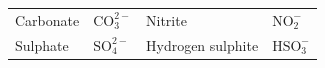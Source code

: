 {{\begin{center}
\begin{tabular}[t]{|l|l|l|l|}
        Carbonate &
    
    
        \begin{math}\mathrm{CO}_{3}^{2-}\end{math} &
    
    
        Nitrite &
    
    
        \begin{math}\mathrm{NO}_{2}^{-}\end{math}%
     \tabularnewline\cline{1-1}\cline{2-2}\cline{3-3}\cline{4-4}
    
    
        Sulphate &
    
    
        \begin{math}\mathrm{SO}_{4}^{2-}\end{math} &
    
    
        Hydrogen sulphite &
    
    
        \begin{math}\mathrm{HSO}_{3}^{-}\end{math}%
     \tabularnewline\cline{1-1}\cline{2-2}\cline{3-3}\cline{4-4}
    

\end{tabular}
\end{center}}}
